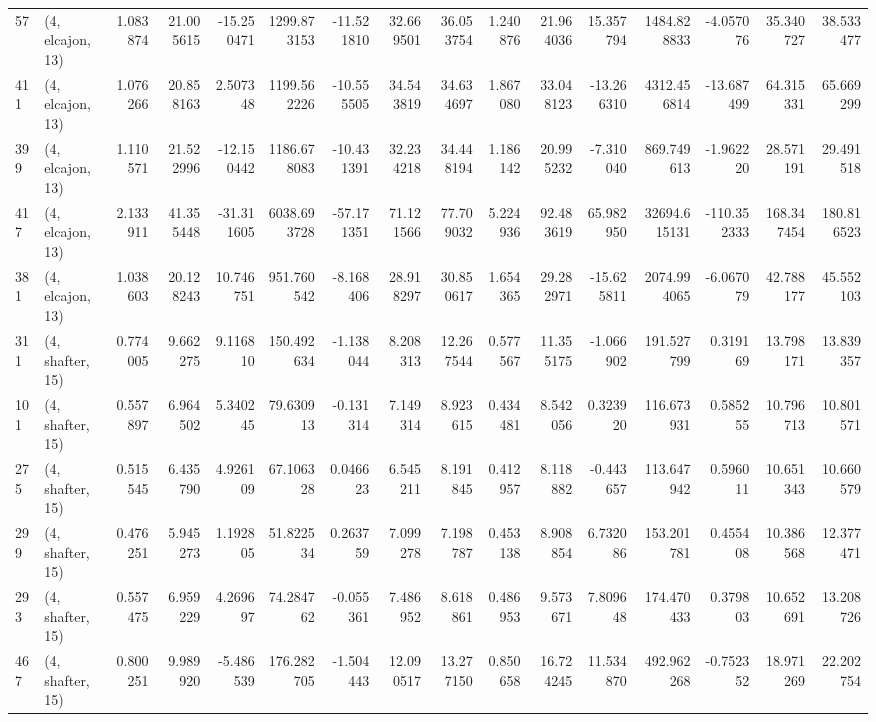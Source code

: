 \begin{tabular}{llrrrrrrrrrrrrrr}
57  &  (4, elcajon, 13) &   1.083874 &  21.005615 & -15.250471 &  1299.873153 & -11.521810 &  32.669501 &  36.053754 &  1.240876 &  21.964036 &  15.357794 &   1484.828833 &   -4.057076 &   35.340727 &   38.533477 \\
411 &  (4, elcajon, 13) &   1.076266 &  20.858163 &   2.507348 &  1199.562226 & -10.555505 &  34.543819 &  34.634697 &  1.867080 &  33.048123 & -13.266310 &   4312.456814 &  -13.687499 &   64.315331 &   65.669299 \\
399 &  (4, elcajon, 13) &   1.110571 &  21.522996 & -12.150442 &  1186.678083 & -10.431391 &  32.234218 &  34.448194 &  1.186142 &  20.995232 &  -7.310040 &    869.749613 &   -1.962220 &   28.571191 &   29.491518 \\
417 &  (4, elcajon, 13) &   2.133911 &  41.355448 & -31.311605 &  6038.693728 & -57.171351 &  71.121566 &  77.709032 &  5.224936 &  92.483619 &  65.982950 &  32694.615131 & -110.352333 &  168.347454 &  180.816523 \\
381 &  (4, elcajon, 13) &   1.038603 &  20.128243 &  10.746751 &   951.760542 &  -8.168406 &  28.918297 &  30.850617 &  1.654365 &  29.282971 & -15.625811 &   2074.994065 &   -6.067079 &   42.788177 &   45.552103 \\
311 &  (4, shafter, 15) &   0.774005 &   9.662275 &   9.116810 &   150.492634 &  -1.138044 &   8.208313 &  12.267544 &  0.577567 &  11.355175 &  -1.066902 &    191.527799 &    0.319169 &   13.798171 &   13.839357 \\
101 &  (4, shafter, 15) &   0.557897 &   6.964502 &   5.340245 &    79.630913 &  -0.131314 &   7.149314 &   8.923615 &  0.434481 &   8.542056 &   0.323920 &    116.673931 &    0.585255 &   10.796713 &   10.801571 \\
275 &  (4, shafter, 15) &   0.515545 &   6.435790 &   4.926109 &    67.106328 &   0.046623 &   6.545211 &   8.191845 &  0.412957 &   8.118882 &  -0.443657 &    113.647942 &    0.596011 &   10.651343 &   10.660579 \\
299 &  (4, shafter, 15) &   0.476251 &   5.945273 &   1.192805 &    51.822534 &   0.263759 &   7.099278 &   7.198787 &  0.453138 &   8.908854 &   6.732086 &    153.201781 &    0.455408 &   10.386568 &   12.377471 \\
293 &  (4, shafter, 15) &   0.557475 &   6.959229 &   4.269697 &    74.284762 &  -0.055361 &   7.486952 &   8.618861 &  0.486953 &   9.573671 &   7.809648 &    174.470433 &    0.379803 &   10.652691 &   13.208726 \\
467 &  (4, shafter, 15) &   0.800251 &   9.989920 &  -5.486539 &   176.282705 &  -1.504443 &  12.090517 &  13.277150 &  0.850658 &  16.724245 &  11.534870 &    492.962268 &   -0.752352 &   18.971269 &   22.202754 \\

\end{tabular}
